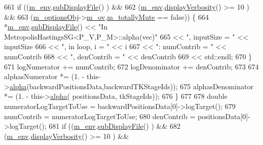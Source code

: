 \begin{DoxyCode}
661 \textcolor{preprocessor}{}    \textcolor{keywordflow}{if} ((\hyperlink{class_q_u_e_s_o_1_1_metropolis_hastings_s_g_ac8ea061e55b920e0c8f9bce5c3f20e52}{m\_env}.\hyperlink{class_q_u_e_s_o_1_1_base_environment_a8a0064746ae8dddfece4229b9ad374d6}{subDisplayFile}()                   ) &&
662         (\hyperlink{class_q_u_e_s_o_1_1_metropolis_hastings_s_g_ac8ea061e55b920e0c8f9bce5c3f20e52}{m\_env}.\hyperlink{class_q_u_e_s_o_1_1_base_environment_a1fe5f244fc0316a0ab3e37463f108b96}{displayVerbosity}() >= 10           ) &&
663         (\hyperlink{class_q_u_e_s_o_1_1_metropolis_hastings_s_g_a5d0bc9f73d50d272aa6bfb5ef5939ef3}{m\_optionsObj}->\hyperlink{class_q_u_e_s_o_1_1_metropolis_hastings_s_g_options_a9d4792d9fc2dc5439b8ab489b0c236eb}{m\_ov}.\hyperlink{class_q_u_e_s_o_1_1_mh_options_values_af812309e81191e88dfdc87c5815141a3}{m\_totallyMute} == \textcolor{keyword}{false})) \{
664       *\hyperlink{class_q_u_e_s_o_1_1_metropolis_hastings_s_g_ac8ea061e55b920e0c8f9bce5c3f20e52}{m\_env}.\hyperlink{class_q_u_e_s_o_1_1_base_environment_a8a0064746ae8dddfece4229b9ad374d6}{subDisplayFile}() << \textcolor{stringliteral}{"In MetropolisHastingsSG<P\_V,P\_M>::alpha(vec)"}
665                              << \textcolor{stringliteral}{", inputSize = "}  << inputSize
666                              << \textcolor{stringliteral}{", in loop, i = "} << i
667                              << \textcolor{stringliteral}{": numContrib = "} << numContrib
668                              << \textcolor{stringliteral}{", denContrib = "} << denContrib
669                              << std::endl;
670     \}
671     logNumerator   += numContrib;
672     logDenominator += denContrib;
673 
674     alphasNumerator   *= (1. - this->\hyperlink{class_q_u_e_s_o_1_1_metropolis_hastings_s_g_ad5c2b3afd5e845ea22518536274a8dd7}{alpha}(backwardPositionsData,backwardTKStageIds));
675     alphasDenominator *= (1. - this->\hyperlink{class_q_u_e_s_o_1_1_metropolis_hastings_s_g_ad5c2b3afd5e845ea22518536274a8dd7}{alpha}(        positionsData,        tkStageIds));
676   \}
677 
678   \textcolor{keywordtype}{double} numeratorLogTargetToUse = backwardPositionsData[0]->logTarget();
679   numContrib = numeratorLogTargetToUse;
680   denContrib = positionsData[0]->logTarget();
681   \textcolor{keywordflow}{if} ((\hyperlink{class_q_u_e_s_o_1_1_metropolis_hastings_s_g_ac8ea061e55b920e0c8f9bce5c3f20e52}{m\_env}.\hyperlink{class_q_u_e_s_o_1_1_base_environment_a8a0064746ae8dddfece4229b9ad374d6}{subDisplayFile}()                   ) &&
682       (\hyperlink{class_q_u_e_s_o_1_1_metropolis_hastings_s_g_ac8ea061e55b920e0c8f9bce5c3f20e52}{m\_env}.\hyperlink{class_q_u_e_s_o_1_1_base_environment_a1fe5f244fc0316a0ab3e37463f108b96}{displayVerbosity}() >= 10           ) &&

\end{DoxyCode}
